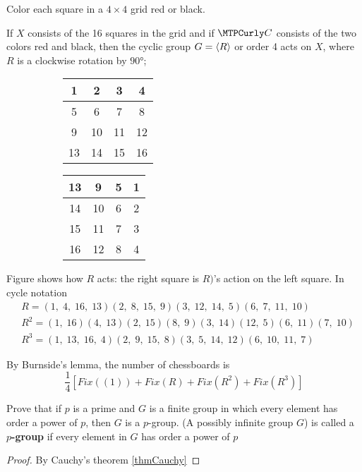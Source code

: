 \documentclass[11pt]{article}
\begin{document}
\begin{examplle}[]
Color each square in a \(4\times 4\) grid red or black.

If \(X\) consists of the 16 squares in the grid and if \(\calc\) consists of the two
colors red and black, then the cyclic group \(G=\langle R\rangle\) or order 4 acts on \(X\),
where \(R\) is a clockwise rotation by \(\ang{90}\); 

\begin{figure}[h]
\centering
\begin{subfigure}[b]{0.4\textwidth}
\begin{tabular}{|c|c|c|c|}
\hline
1 & 2 & 3 & 4\\
\hline
5 & 6 & 7 & 8\\
\hline
9 & 10 & 11 & 12\\
\hline
13 & 14 & 15 & 16\\
\hline
\end{tabular}
\end{subfigure}
\begin{subfigure}[b]{0.4\textwidth}
\begin{tabular}{|c|c|c|c|}
\hline
13 & 9 & 5 & 1\\
\hline
14 & 10 & 6 & 2\\
\hline
15 & 11 & 7 & 3\\
\hline
16 & 12 & 8 & 4\\
\hline
\end{tabular}
\end{subfigure}
\label{fig2.10}
\end{figure}

Figure shows how \(R\) acts: the right square is \(R)\)'s action on the left
square. In cycle notation
\begin{align*}
&R=(1,\;4,\;16,\;13)(2,\;8,\;15,\;9)(3,\;12,\;14,\;5)(6,\;7,\;11,\;10)\\
&R^2=(1,\;16)(4,\;13)(2,\;15)(8,\;9)(3,\;14)(12,\;5)(6,\;11)(7,\;10)\\
&R^3=(1,\;13,\;16,\;4)(2,\;9,\;15,\;8)(3,\;5,\;14,\;12)(6,\;10,\;11,\;7)
\end{align*}

By Burnside's lemma, the number of chessboards is
\begin{equation*}
\frac{1}{4}[Fix((1))+Fix(R)+Fix(R^2)+Fix(R^3)]
\end{equation*}
\end{examplle}



\begin{exercise}
Prove that if \(p\) is a prime and \(G\) is a finite group in which every element
has order a power of \(p\), then \(G\) is a \(p\)-group. (A possibly infinite group
\(G\)) is called a \textbf{\(p\)-group} if every element in \(G\) has order a power of \(p\)
\end{exercise}
\begin{proof}
By Cauchy's theorem \ref{thmCauchy}
\end{proof}
\end{document}
